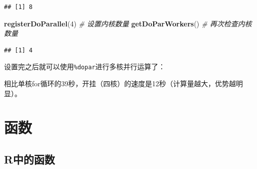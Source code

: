 \documentclass[]{book}
\newenvironment{Shaded}{\begin{snugshade}}{\end{snugshade}}
\newcommand{\CommentTok}[1]{\textcolor[rgb]{0.56,0.35,0.01}{\textit{#1}}}
\newcommand{\DataTypeTok}[1]{\textcolor[rgb]{0.13,0.29,0.53}{#1}}
\newcommand{\DecValTok}[1]{\textcolor[rgb]{0.00,0.00,0.81}{#1}}
\newcommand{\KeywordTok}[1]{\textcolor[rgb]{0.13,0.29,0.53}{\textbf{#1}}}
\newcommand{\NormalTok}[1]{#1}
\newcommand{\OperatorTok}[1]{\textcolor[rgb]{0.81,0.36,0.00}{\textbf{#1}}}
\newcommand{\StringTok}[1]{\textcolor[rgb]{0.31,0.60,0.02}{#1}}
\begin{document}
\begin{verbatim}
## [1] 8
\end{verbatim}

\begin{Shaded}
\begin{Highlighting}[]
\KeywordTok{registerDoParallel}\NormalTok{(}\DecValTok{4}\NormalTok{) }\CommentTok{# 设置内核数量}
\KeywordTok{getDoParWorkers}\NormalTok{() }\CommentTok{# 再次检查内核数量}
\end{Highlighting}
\end{Shaded}

\begin{verbatim}
## [1] 4
\end{verbatim}

设置完之后就可以使用\texttt{\%dopar}进行多核并行运算了：

\begin{Shaded}
\end{Shaded}

相比单核for循环的39秒，开挂（四核）的速度是12秒（计算量越大，优势越明显）。

\hypertarget{functions}{%
\section{函数}\label{functions}}

\hypertarget{functions-in-R}{%
\subsection{R中的函数}\label{functions-in-R}}
\end{document}
